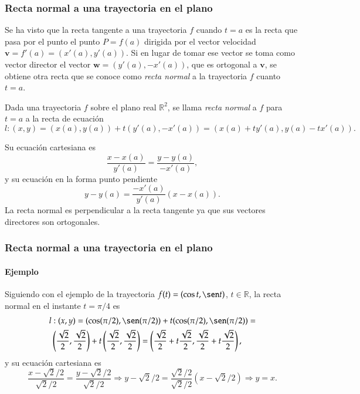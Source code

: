 \begin{frame}
	\frametitle{Recta normal a una trayectoria en el plano}
	Se ha visto que la recta tangente a una trayectoria $f$ cuando $t=a$ es la recta que pasa por el punto el punto
	$P=f(a)$ dirigida por el vector velocidad $\mathbf{v}=f'(a)=(x'(a),y'(a))$. Si en lugar de tomar ese vector se
	toma como vector director el vector $\mathbf{w}=(y'(a),-x'(a))$, que es ortogonal a $\mathbf{v}$, se obtiene otra
	recta que se conoce como \emph{recta normal} a la trayectoria $f$ cuanto $t=a$.
	\begin{definicion}
		Dada una trayectoria $f$ sobre el plano real $\mathbb{R}^2$, se llama \emph{recta normal} a $f$ para $t=a$ a la recta de ecuación
		\[
			l: (x,y)=(x(a),y(a))+t(y'(a),-x'(a)) = (x(a)+ty'(a),y(a)-tx'(a)).
		\]
	\end{definicion}
	Su ecuación cartesiana es
	\[
		\frac{x-x(a)}{y'(a)} = \frac{y-y(a)}{-x'(a)},
	\]
	y su ecuación en la forma punto pendiente
	\[
		y-y(a) = \frac{-x'(a)}{y'(a)}(x-x(a)).
	\]
	La recta normal es perpendicular a la recta tangente ya que sus vectores directores son ortogonales.
\end{frame}


\begin{frame}
	\frametitle{Recta normal a una trayectoria en el plano}
	\framesubtitle{Ejemplo}
	Siguiendo con el ejemplo de la trayectoria $f(t) = (\cos t,\sen t)$, $t\in \mathbb{R}$, la recta normal en el instante $t=\pi/4$ es
	\begin{align*}
		l & : (x,y)=(\cos(\pi/2),\sen(\pi/2))+t(\cos(\pi/2),\sen(\pi/2)) =                                         \\
		  & \left(\frac{\sqrt{2}}{2},\frac{\sqrt{2}}{2}\right)+t\left(\frac{\sqrt{2}}{2},\frac{\sqrt{2}}{2}\right) 
		=\left(\frac{\sqrt{2}}{2}+t\frac{\sqrt{2}}{2},\frac{\sqrt{2}}{2}+t\frac{\sqrt{2}}{2}\right),
	\end{align*}
	y su ecuación cartesiana es
	\[
		\frac{x-\sqrt{2}/2}{\sqrt{2}/2} = \frac{y-\sqrt{2}/2}{\sqrt{2}/2}\Rightarrow y-\sqrt{2}/2 = \frac{\sqrt{2}/2}{\sqrt{2}/2}(x-\sqrt{2}/2) \Rightarrow y=x.
	\]
	\begin{center}
		\scalebox{0.8}{}
	\end{center}
\end{frame}



